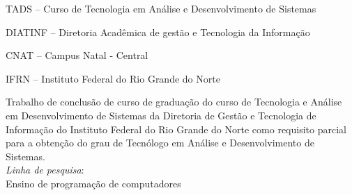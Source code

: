 
\instituicao
{
   TADS -- Curso de Tecnologia em Análise e Desenvolvimento de
   Sistemas\par
   DIATINF -- Diretoria Acadêmica de gestão e Tecnologia da Informação\par
   CNAT -- Campus Natal - Central\par
   IFRN -- Instituto Federal do Rio Grande do Norte }

\comentario
{
	Trabalho de conclusão de curso de graduação do curso de Tecnologia e Análise em
	Desenvolvimento de Sistemas da Diretoria de Gestão e Tecnologia de Informação
	do Instituto Federal do Rio Grande do Norte como requisito parcial para a
	obtenção do grau de Tecnólogo em Análise e Desenvolvimento de
	Sistemas.\bigskip\\
   \textit{Linha de pesquisa}:\\Ensino de programação de computadores
}


\folhaderosto
